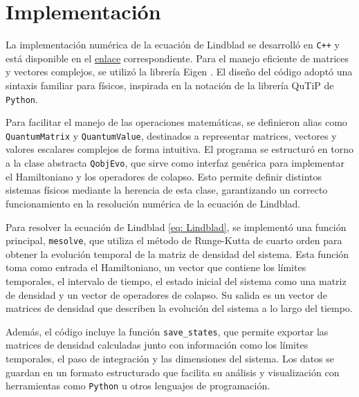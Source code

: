 \section{Implementación} \label{sec: metodologia}

La implementación numérica de la ecuación de Lindblad se desarrolló en \texttt{C++} y está disponible en el \href{}{enlace} correspondiente. Para el manejo eficiente de matrices y vectores complejos, se utilizó la librería Eigen \cite{eigenweb}. El diseño del código adoptó una sintaxis familiar para físicos, inspirada en la notación de la librería QuTiP \cite{qutip1,qutip2} de \texttt{Python}.

Para facilitar el manejo de las operaciones matemáticas, se definieron alias como \texttt{QuantumMatrix} y \texttt{QuantumValue}, destinados a representar matrices, vectores y valores escalares complejos de forma intuitiva. El programa se estructuró en torno a la clase abstracta \texttt{QobjEvo}, que sirve como interfaz genérica para implementar el Hamiltoniano y los operadores de colapso. Esto permite definir distintos sistemas físicos mediante la herencia de esta clase, garantizando un correcto funcionamiento en la resolución numérica de la ecuación de Lindblad.

Para resolver la ecuación de Lindblad \ref{eq: Lindblad}, se implementó una función principal, \texttt{mesolve}, que utiliza el método de Runge-Kutta de cuarto orden para obtener la evolución temporal de la matriz de densidad del sistema. Esta función toma como entrada el Hamiltoniano, un vector que contiene los límites temporales, el intervalo de tiempo, el estado inicial del sistema como una matriz de densidad y un vector de operadores de colapso. Su salida es un vector de matrices de densidad que describen la evolución del sistema a lo largo del tiempo.

Además, el código incluye la función \texttt{save\_states}, que permite exportar las matrices de densidad calculadas junto con información como los límites temporales, el paso de integración y las dimensiones del sistema. Los datos se guardan en un formato estructurado que facilita su análisis y visualización con herramientas como \texttt{Python} u otros lenguajes de programación.

